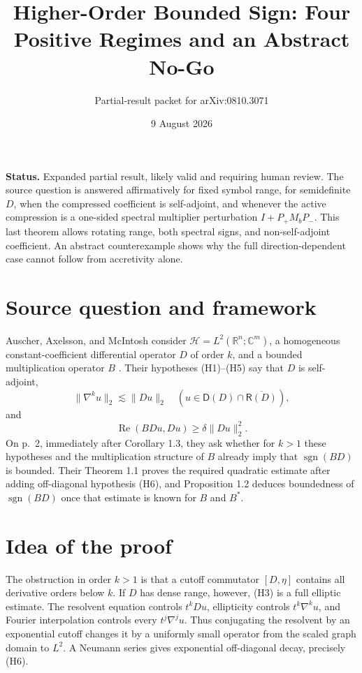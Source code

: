 \documentclass[11pt]{article}
\title{Higher-Order Bounded Sign: Four Positive Regimes and an Abstract No-Go}
\author{Partial-result packet for arXiv:0810.3071}
\date{9 August 2026}
\newcommand{\Hh}{\mathcal H}
\newcommand{\Dom}{\mathsf D}
\newcommand{\Ran}{\mathsf R}
\newcommand{\sgn}{\operatorname{sgn}}
\begin{document}
\maketitle

\noindent\colorbox{softgray}{\parbox{0.95\linewidth}{
\textbf{Status.} \textcolor{statusblue}{Expanded partial result, likely valid
and requiring human review.} The source question is answered affirmatively
for fixed symbol range, for semidefinite $D$, when the compressed coefficient
is self-adjoint, and whenever the active compression is a one-sided spectral
multiplier perturbation $I+P_+M_bP_-$.  This last theorem allows rotating
range, both spectral signs, and non-self-adjoint coefficient. An abstract
counterexample shows why the full direction-dependent case cannot follow from
accretivity alone.
}}

\section*{Source question and framework}
Auscher, Axelsson, and McIntosh consider
$\Hh=L^2(\mathbb R^n;\mathbb C^m)$, a homogeneous constant-coefficient
differential operator $D$ of order $k$, and a bounded multiplication operator
$B$ \cite{AAM}. Their hypotheses (H1)--(H5) say that $D$ is self-adjoint,
\[
 \|\nabla^k u\|_2\lesssim\|Du\|_2
 \quad
 (u\in\Dom(D)\cap\overline{\Ran(D)}),
\]
and
\[
 \operatorname{Re}(BDu,Du)\geq\delta\|Du\|_2^2.
\]
On p.~2, immediately after Corollary 1.3, they ask whether for $k>1$
these hypotheses and the multiplication structure of $B$ already imply that
$\sgn(BD)$ is bounded. Their Theorem 1.1 proves the required quadratic
estimate after adding off-diagonal hypothesis (H6), and Proposition 1.2
deduces boundedness of $\sgn(BD)$ once that estimate is known for $B$ and
$B^*$.

\section*{Idea of the proof}
The obstruction in order $k>1$ is that a cutoff commutator $[D,\eta]$ contains
all derivative orders below $k$. If $D$ has dense range, however, (H3) is a
full elliptic estimate. The resolvent equation controls $t^kDu$, ellipticity
controls $t^k\nabla^ku$, and Fourier interpolation controls every
$t^j\nabla^ju$. Thus conjugating the resolvent by an exponential cutoff
changes it by a uniformly small operator from the scaled graph domain to
$L^2$. A Neumann series gives exponential off-diagonal decay, precisely (H6).
\end{document}
